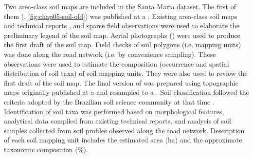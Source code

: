 Two area-class soil maps are included in the Santa Maria dataset. The first of them (\soilOld{}, 
\autoref{fig:chap05-soil-old}) was published at a  \cite{AzolinEtAl1988}. Existing area-class 
soil maps and technical reports \cite{Brasil1973, Azolin1977, MacielEtAl1987a, MacielEtAl1987, AbraoEtAl1988}, 
and sparse field observations were used to elaborate the preliminary legend of the soil map. Aerial 
photographs () were used to produce the first draft of the soil map. Field checks of soil 
polygons (i.e. mapping units) was done along the road network (i.e. by convenience sampling). These 
observations were used to estimate the composition (occurrence and spatial distribution of soil taxa) of soil 
mapping units. They were also used to review the first draft of the soil map. The final version of \soilOld{} 
was prepared using topographic maps originally published at a  and resampled to a . 
Soil classification followed the criteria adopted by the Brazilian soil science community at that time 
\cite{Brasil1973, CamargoEtAl1982, Carvalho1982, LemosEtAl1982, OlmosEtAl1982}. Identification of soil taxa 
was performed based on morphological features, analytical data compiled from existing technical reports, and 
analysis of soil samples collected from soil profiles observed along the road network. Description of each 
soil mapping unit includes the estimated area (\si{\hectare}) and the approximate taxonomic composition 
(\si{\percent}).

